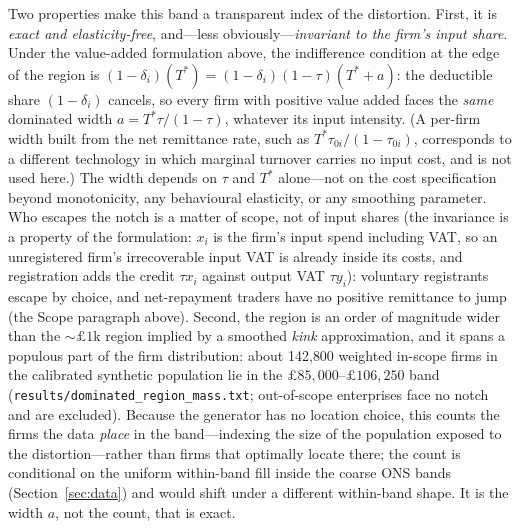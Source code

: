 Two properties make this band a transparent index of the distortion. First, it
is \emph{exact and elasticity-free}, and---less obviously---\emph{invariant to
the firm's input share}. Under the value-added formulation above, the
indifference condition at the edge of the region is
$(1-\delta_i)(T^{*}) = (1-\delta_i)(1-\tau)(T^{*}+a)$: the deductible share
$(1-\delta_i)$ cancels, so every firm with positive value added faces the
\emph{same} dominated width $a=T^{*}\tau/(1-\tau)$, whatever its input
intensity. (A per-firm width built from the net remittance rate, such as
$T^{*}\tau_{0i}/(1-\tau_{0i})$, corresponds to a different technology in which
marginal turnover carries no input cost, and is not used here.) The width
depends on $\tau$ and $T^{*}$ alone---not on the cost specification beyond
monotonicity, any
behavioural elasticity, or any smoothing parameter. Who escapes the notch is a
matter of scope, not of input shares (the invariance is a property of the
formulation: $x_i$ is the firm's input spend including VAT, so an
unregistered firm's irrecoverable input VAT is already inside its costs, and
registration adds the credit $\tau x_i$ against output VAT $\tau y_i$): voluntary registrants escape by choice,
and net-repayment traders have no positive remittance to jump
(the Scope paragraph above). Second, the region is an order of magnitude wider
than the $\sim\pounds1$k region implied by a smoothed \emph{kink}
approximation, and it spans a populous part of the firm distribution: about
142{,}800 weighted in-scope firms in the calibrated synthetic population lie
in the $\pounds85{,}000$--$\pounds106{,}250$ band
(\texttt{results/dominated\_region\_mass.txt}; out-of-scope enterprises face
no notch and are excluded). Because the generator has no location choice, this
counts the firms the data \emph{place} in the band---indexing the size of the
population exposed to the distortion---rather than firms that optimally locate
there; the count is conditional on the uniform within-band fill inside the
coarse ONS bands (Section~\ref{sec:data}) and would shift under a different
within-band shape. It is the width $a$, not the count, that is exact.

